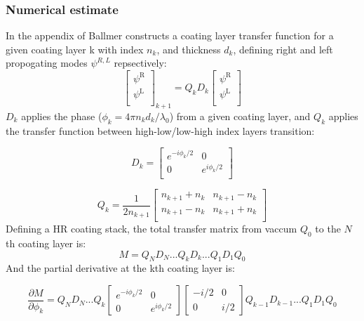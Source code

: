 \subsubsection*{Numerical estimate}\label{algaas_numericalestimate}

In the appendix of \cite{ballmer:2015} Ballmer constructs a coating layer transfer function for a given coating layer k with index $n_k$, and thickness $d_k$, defining right and left propogating modes $\psi^{R,L}$ repsectively:
$$
  \left[ {\begin{array}{c}
   \psi^\mathrm{R} \\
   \psi^\mathrm{L} \\
  \end{array} } \right]_{k+1}
  =
%
Q_k D_k
%
 \left[{\begin{array}{c}
   \psi^\mathrm{R} \\
   \psi^\mathrm{L} \\
 \end{array}} \right]
$$
\noindent $D_k$ applies the phase ($\phi_k = 4\pi n_k d_k /\lambda_0$) from a given coating layer, and $Q_k$ applies the transfer function between high-low/low-high index layers transition:

\begin{equation}
D_k =
\left[ {\begin{array}{cc}
  e^{-i \phi_k / 2}& 0\\
 0 & e^{i \phi_k / 2}\\
\end{array} } \right]
\end{equation}

\begin{equation}
Q_k = \frac{1}{2n_{k+1}}
\left[ {\begin{array}{cc}
  n_{k+1} + n_k & n_{k+1} - n_k\\
 n_{k+1} - n_k & n_{k+1} + n_k\\
\end{array} } \right]
\end{equation}
\noindent Defining a HR coating stack, the total transfer matrix from vaccum $Q_0$ to the $N$th coating layer is:
\begin{equation}
	M = Q_N D_N ...Q_k D_k...Q_1D_1Q_0
\end{equation}
\noindent And the partial derivative at the kth coating layer is:

\begin{equation}
	\label{eq:partialM}
	\frac{\partial M}{\partial \phi_k} = Q_N D_N ...Q_{k} \begin{bmatrix} e^{-i \phi_k /2} & 0 \\ 0 & e^{i \phi_k/2} \end{bmatrix} \begin{bmatrix} -i /2 & 0 \\ 0 & i/2 \end{bmatrix} Q_{k-1} D_{k-1}...Q_1D_1Q_0
\end{equation}

